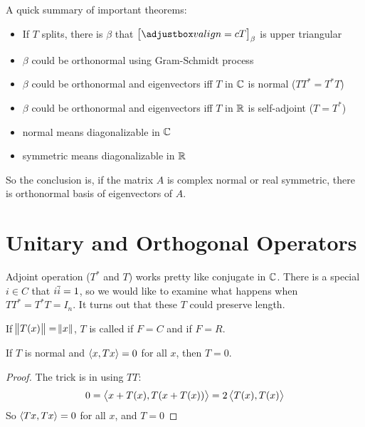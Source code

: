 A quick summary of important theorems:
\begin{itemize}
    \item If $T$ splits, there is $\beta$ that $\coordinate{T}_\beta$ is upper triangular
    \item $\beta$ could be orthonormal using Gram-Schmidt process
    \item $\beta$ could be orthonormal and eigenvectors iff $T$ in $\mathbb{C}$ is normal ($TT^* = T^*T$)
    \item $\beta$ could be orthonormal and eigenvectors iff $T$ in $\mathbb{R}$ is self-adjoint ($T = T^*$)
    \item normal means diagonalizable in $\mathbb{C}$
    \item symmetric means diagonalizable in $\mathbb{R}$
\end{itemize}


So the conclusion is, if the matrix $A$ is complex normal or real symmetric, there is orthonormal basis of eigenvectors of $A$.

\section{Unitary and Orthogonal Operators}

Adjoint operation ($T^*$ and $T$) works pretty like conjugate in $\mathbb{C}$. There is a special $i \in C$  that $i \overline{i} = 1$, so we would like to examine what happens when $TT^* = T^* T = I_n$. It turns out that these $T$ could preserve length.

\begin{definition}\label{unitary}
    If $\norm{T(x)} = \norm{x}$, $T$ is called  if $F=C$ and  if $F=R$.
\end{definition}


\begin{theorem}\label{normal_zero_operator}
    If $T$ is normal and $\left\langle \displaystyle x, Tx \right\rangle = 0$ for all $x$, then $T=0$.
\end{theorem}
\begin{proof}
    The trick is in using $TT$:
    \begin{equation*}
        0 = \left\langle \displaystyle x + T(x), T(x + T(x)) \right\rangle = 2 \left\langle \displaystyle T(x), T(x) \right\rangle
    \end{equation*}
    So $\left\langle \displaystyle Tx, Tx \right\rangle = 0$ for all $x$, and $T = 0$
\end{proof}


